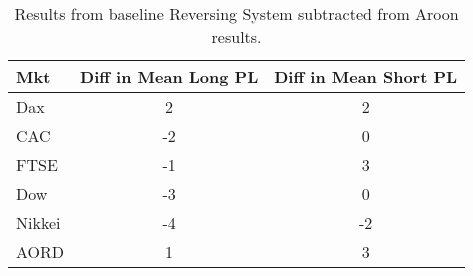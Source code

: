 \begin{table}[ht]
\centering
\caption[Aroon results minus baseline]{Results from baseline Reversing System subtracted from Aroon results.} 
\label{tab:aroon_results_diff}
\begin{tabular}{lcc}
  \toprule Mkt & Diff in Mean Long PL & Diff in Mean Short PL \\ 
  \midrule Dax & 2 & 2 \\ 
  CAC & -2 & 0 \\ 
  FTSE & -1 & 3 \\ 
  Dow & -3 & 0 \\ 
  Nikkei & -4 & -2 \\ 
  AORD & 1 & 3 \\ 
   \bottomrule \end{tabular}
\end{table}
